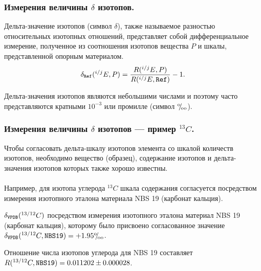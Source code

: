 \begin{frame}
\frametitle{Измерения величины $\delta$ изотопов.}
Дельта-значение изотопов (символ $\delta$), также называемое разностью относительных изотопных отношений, представляет собой дифференциальное измерение, полученное из соотношения изотопов вещества $P$ и шкалы, представленной опорным материалом. 
\begin{equation} \label{DeltaIsotopesDef} %
\delta_{\tt Ref}(^{i/j}E, P)  = \frac{R(^{i/j}E, P)}{R(^{i/j}E, {\tt Ref})} - 1.
\end{equation}

\medskip
Дельта-значения изотопов являются небольшими числами и поэтому часто представляются кратными $10^{-3}$ или промилле (символ ${}^\text{o}\mkern-5mu/\mkern-3mu_\text{oo}$). 


\end{frame}


\begin{frame}
\frametitle{Измерения величины $\delta$ изотопов --- пример $^{13}C$.}

Чтобы согласовать дельта-шкалу изотопов элемента со шкалой количеств изотопов, необходимо вещество (образец),
содержание изотопов и дельта-значения изотопов которых также хорошо известны.\\
~\\

Например, для изотопа углерода $^{13}C$ шкала содержания согласуется посредством измерения изотопного эталона
материала NBS 19 (карбонат кальция).


\medskip

$\delta_{\tt VPDB}(^{13/12}C)$ посредством измерения изотопного эталона
материал NBS 19 (карбонат кальция), которому было присвоено согласованное значение $\delta_{\tt VPDB}(^{13/12}C, {\tt NBS 19}) = +1.95 {}^\text{o}\mkern-5mu/\mkern-3mu_\text{oo}$. 

\medskip
Отношение числа изотопов углерода для NBS 19 составляет
$R(^{13/12}C, {\tt NBS 19}) = 0.011 202 \pm 0.000 028$. 

\end{frame}



